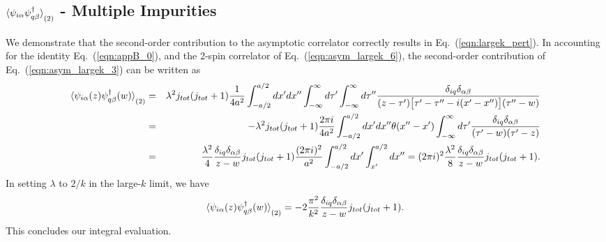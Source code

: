 \documentclass[aps,prb,twocolumn,superscriptaddress]{revtex4-1}
\begin{document}
\begin{widetext}
\section{$\braket{\psi_{i\alpha}\psi_{q\beta}^{\dagger}}_{(2)}$ - Multiple Impurities}  \label{app:asymcorrM_int}
We demonstrate that the second-order contribution to the asymptotic correlator correctly results in Eq.~(\ref{eqn:largek_pert}). In accounting for the identity Eq.~(\ref{eqn:appB_0}), and the 2-spin correlator of Eq.~(\ref{eqn:asym_largek_6}), the second-order contribution of Eq.~(\ref{eqn:asym_largek_3}) can be written as 
\begin{eqnarray}
\braket{\psi_{i\alpha}(z)\psi_{q\beta}^{\dagger}(w)}_{(2)}&=&\lambda^{2}j_{tot}(j_{tot}+1)\frac{1}{4a^{2}}\int_{-a/2}^{a/2}{dx'dx''}\int_{-\infty}^{\infty}d\tau'\int_{-\infty}^{\infty}d\tau''\frac{\delta_{iq}\delta_{\alpha\beta}}{(z-\tau')\bigl[\tau'-\tau''-i(x'-x'')\bigr](\tau''-w)} \nonumber \\
&=&-\lambda^{2}j_{tot}(j_{tot}+1)\frac{2\pi i}{4a^{2}}\int_{-a/2}^{a/2}{dx'dx''}\theta(x''-x')\int_{-\infty}^{\infty}{d\tau'}\frac{\delta_{iq}\delta_{\alpha\beta}}{(\tau'-w)(\tau'-z)} \nonumber \\
&=&\frac{\lambda^{2}}{4}\frac{\delta_{iq}\delta_{\alpha\beta}}{z-w}j_{tot}(j_{tot}+1)\frac{(2\pi i)^{2}}{a^{2}}\int_{-a/2}^{a/2}dx'\int_{x'}^{a/2}dx''=(2\pi i)^{2}\frac{\lambda^{2}}{8}\frac{\delta_{iq}\delta_{\alpha\beta}}{z-w}j_{tot}(j_{tot}+1). \label{eqn:appB_1}
\end{eqnarray}
In setting $\lambda$ to $2/k$ in the large-$k$ limit, we have
\begin{eqnarray}
\braket{\psi_{i\alpha}(z)\psi_{q\beta}^{\dagger}(w)}_{(2)}=-2\frac{\pi^{2}}{k^{2}}\frac{\delta_{iq}\delta_{\alpha\beta}}{z-w}j_{tot}(j_{tot}+1). \label{eqn:appB_2}
\end{eqnarray}
This concludes our integral evaluation. 



\end{widetext}
\end{document}
